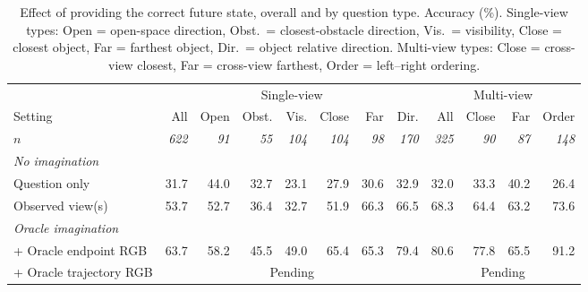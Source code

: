 \begin{table}[!tb]
\centering
\caption{Effect of providing the correct future state, overall and by question type. Accuracy (\%).
Single-view types: Open = open-space direction, Obst.\ = closest-obstacle direction, Vis.\ = visibility,
Close = closest object, Far = farthest object, Dir.\ = object relative direction.
Multi-view types: Close = cross-view closest, Far = cross-view farthest, Order = left--right ordering.}
\label{tab:oracle_imagination}
\begin{tabular}{l rrrrrrr rrrr}
\toprule
& \multicolumn{7}{c}{Single-view} & \multicolumn{4}{c}{Multi-view} \\
\cmidrule(lr){2-8}\cmidrule(lr){9-12}
Setting & All & Open & Obst. & Vis. & Close & Far & Dir. & All & Close & Far & Order \\
\textit{$n$} & \textit{622} & \textit{91} & \textit{55} & \textit{104} & \textit{104} & \textit{98} & \textit{170} & \textit{325} & \textit{90} & \textit{87} & \textit{148} \\
\midrule
\multicolumn{12}{l}{\emph{No imagination}} \\
\quad Question only           & 31.7 & 44.0 & 32.7 & 23.1 & 27.9 & 30.6 & 32.9 & 32.0 & 33.3 & 40.2 & 26.4 \\
\quad Observed view(s)        & 53.7 & 52.7 & 36.4 & 32.7 & 51.9 & 66.3 & 66.5 & 68.3 & 64.4 & 63.2 & 73.6 \\
\midrule
\multicolumn{12}{l}{\emph{Oracle imagination}} \\
\quad + Oracle endpoint RGB   & 63.7 & 58.2 & 45.5 & 49.0 & 65.4 & 65.3 & 79.4 & 80.6 & 77.8 & 65.5 & 91.2 \\
\quad + Oracle trajectory RGB & \multicolumn{7}{c}{Pending} & \multicolumn{4}{c}{Pending} \\
\bottomrule
\end{tabular}
\end{table}
